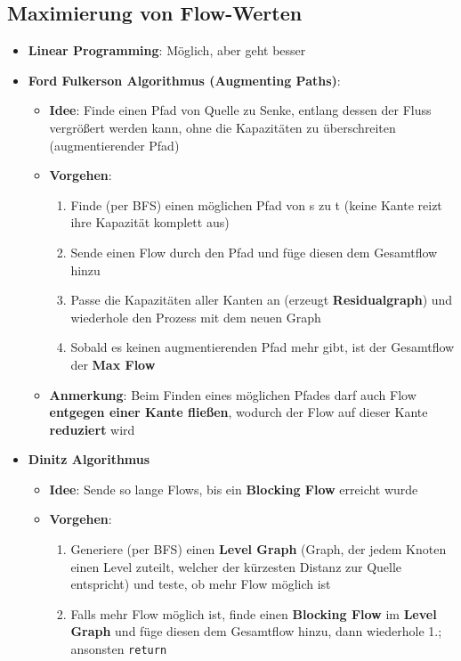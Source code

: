 \subsection{Maximierung von Flow-Werten}%
\label{mfm:sub:maximierung_von_flow_werten}

\begin{itemize}
	\item \textbf{Linear Programming}: Möglich, aber geht besser
	\item \textbf{Ford Fulkerson Algorithmus (Augmenting Paths)}:
	\begin{itemize}
		\item \textbf{Idee}: Finde einen Pfad von Quelle zu Senke, entlang dessen der Fluss vergrößert werden kann, ohne die Kapazitäten zu überschreiten (augmentierender Pfad)
		\item \textbf{Vorgehen}:
		\begin{enumerate}
			\item Finde (per BFS) einen möglichen Pfad von s zu t (keine Kante reizt ihre Kapazität komplett aus)
			\item Sende einen Flow durch den Pfad und füge diesen dem Gesamtflow hinzu
			\item Passe die Kapazitäten aller Kanten an (erzeugt \textbf{Residualgraph}) und wiederhole den Prozess mit dem neuen Graph
			\item Sobald es keinen augmentierenden Pfad mehr gibt, ist der Gesamtflow der \textbf{Max Flow}
		\end{enumerate}
		\item \textbf{Anmerkung}: Beim Finden eines möglichen Pfades darf auch Flow \textbf{entgegen einer Kante fließen}, wodurch der Flow auf dieser Kante \textbf{reduziert} wird
	\end{itemize}
	\newpage
	\item \textbf{Dinitz Algorithmus}
	\begin{itemize}
		\item \textbf{Idee}: Sende so lange Flows, bis ein \textbf{Blocking Flow} erreicht wurde
		\item \textbf{Vorgehen}:
		\begin{enumerate}
			\item Generiere (per BFS) einen \textbf{Level Graph} (Graph, der jedem Knoten einen Level zuteilt, welcher der kürzesten Distanz zur Quelle entspricht) und teste, ob mehr Flow möglich ist
			\item Falls mehr Flow möglich ist, finde einen \textbf{Blocking Flow} im \textbf{Level Graph} und füge diesen dem Gesamtflow hinzu, dann wiederhole 1.; ansonsten \texttt{return}
		\end{enumerate}
	\end{itemize}
\end{itemize}

